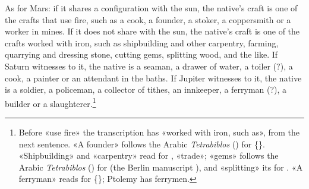 \documentclass[11pt]{article}
\begin{document}
\par As for Mars: if it shares a configuration with the sun, the native's craft is one of the crafts that use fire, such as a cook, a founder, a stoker, a coppersmith or a worker in mines. If it does not share with the sun, the native's craft is one of the crafts worked with iron, such as shipbuilding and other carpentry, farming, quarrying and dressing stone, cutting gems, splitting wood, and the like. If Saturn witnesses to it, the native is a seaman, a drawer of water, a toiler (?), a cook, a painter or an attendant in the baths. If Jupiter witnesses to it, the native is a soldier, a policeman, a collector of tithes, an innkeeper, a ferryman (?), a builder or a slaughterer.\footnote{Before «use fire» the transcription has «worked with iron, such as», from the next sentence. «A founder» follows the Arabic \emph{Tetrabiblos} () for \{\}. «Shipbuilding» and «carpentry» read  for , «trade»; «gems» follows the Arabic \emph{Tetrabiblos} () for  (the Berlin manuscript ), and «splitting» its  for . «A ferryman» reads  for \{\}; Ptolemy has ferrymen.}\par
\end{document}
